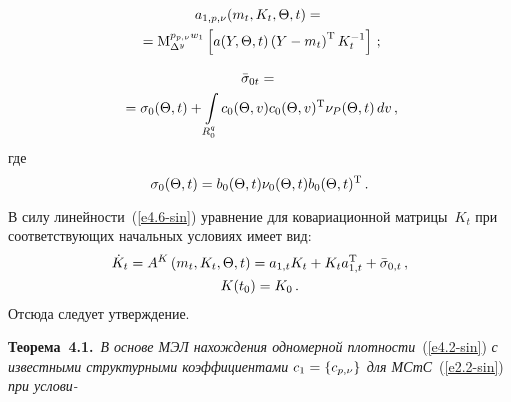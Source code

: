 \begin{multicols}{2}
    \vspace*{-12pt}

    \noindent
    \begin{multline*}
a_{1,p,\nu}(m_t,K_t,\Theta,t)={}\\
{}= \mathrm{M}_{\Delta^y}^{p_{p,\nu}w_1} 
\left[a(Y,\Theta, t) \left(Y-m_t\right)^{\mathrm{T}} K_t^{-1}\right]\,;
\end{multline*}

 \vspace*{-12pt}

    \noindent
    \begin{multline*}
\bar{\sigma}_{0t}={}\\
{}=\sigma_0 (\Theta,t) +\int\limits_{R_0^q} c_0(\Theta,v) c_0(\Theta,v)^{\mathrm{T}} \nu_P (\Theta,t)
   \, dv\,,
    \end{multline*}
    где
    \begin{equation}
\sigma_{0}(\Theta,t) = b_0(\Theta,t)\nu_0(\Theta,t) b_0(\Theta,t)^{\mathrm{T}}\,.
\label{e4.11-sin}
\end{equation}

В силу линейности~(\ref{e4.6-sin})  уравнение для ковариационной матрицы~$K_t$ 
при соответствующих начальных условиях имеет вид:
\begin{multline}
\dot K_t=A^K \left(m_t, K_t, \Theta, t\right) =
a_{1,t} K_t + K_t a_{1,t}^{\mathrm{T}} +\bar{\sigma}_{0,t} \,,
    \\ K(t_0)= K_0\,.
        \label{e4.12-sin}
    \end{multline}
Отсюда следует  утверждение.

\smallskip

\noindent
\textbf{Теорема~4.1.}\ \textit{В основе МЭЛ нахождения одномерной плотности}~(\ref{e4.2-sin}) 
\textit{с известными структурными коэффициентами $c_1\hm=\lf
c_{p,\nu}\rf$ для МСтС}~(\ref{e2.2-sin}) \textit{при услови-}\linebreak\vspace*{-12pt}

\pagebreak


\end{multicols}
